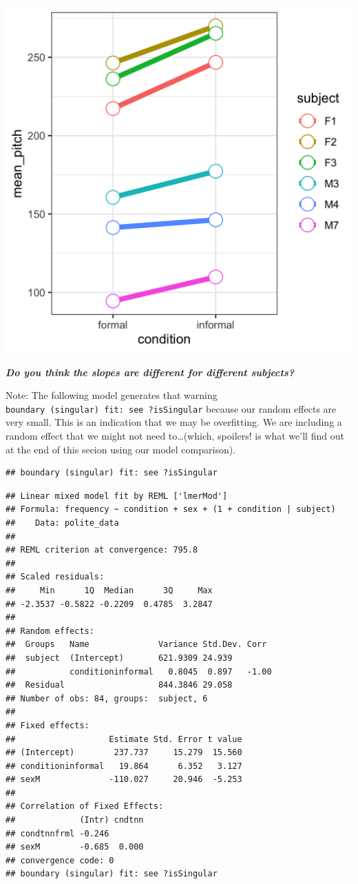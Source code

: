 \documentclass[
  openany]{book}
\begin{document}
\includegraphics[width=16.67in]{images/m3/subject_slopes}

\textbf{\emph{Do you think the slopes are different for different subjects?}}

Note: The following model generates that warning \texttt{boundary\ (singular)\ fit:\ see\ ?isSingular} because our random effects are very small. This is an indication that we may be overfitting. We are including a random effect that we might not need to\ldots(which, spoilers! is what we'll find out at the end of this secion using our model comparison).

\begin{verbatim}
## boundary (singular) fit: see ?isSingular
\end{verbatim}

\begin{verbatim}
## Linear mixed model fit by REML ['lmerMod']
## Formula: frequency ~ condition + sex + (1 + condition | subject)
##    Data: polite_data
## 
## REML criterion at convergence: 795.8
## 
## Scaled residuals: 
##     Min      1Q  Median      3Q     Max 
## -2.3537 -0.5822 -0.2209  0.4785  3.2847 
## 
## Random effects:
##  Groups   Name              Variance Std.Dev. Corr 
##  subject  (Intercept)       621.9309 24.939        
##           conditioninformal   0.8045  0.897   -1.00
##  Residual                   844.3846 29.058        
## Number of obs: 84, groups:  subject, 6
## 
## Fixed effects:
##                   Estimate Std. Error t value
## (Intercept)        237.737     15.279  15.560
## conditioninformal   19.864      6.352   3.127
## sexM              -110.027     20.946  -5.253
## 
## Correlation of Fixed Effects:
##             (Intr) cndtnn
## condtnnfrml -0.246       
## sexM        -0.685  0.000
## convergence code: 0
## boundary (singular) fit: see ?isSingular
\end{verbatim}
\end{document}
